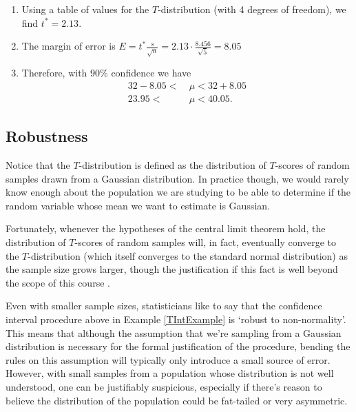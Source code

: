 \begin{example}
\begin{enumerate}[label=\textnormal{\Roman*}.]
\item Using a table of values for the $T$-distribution (with 4 degrees of freedom), we find $t^* = 2.13$.
\item The margin of error is $E = t^{*} \frac{s}{\sqrt{n}} = 2.13 \cdot \frac{8.456}{\sqrt{5}} = 8.05$
\item Therefore, with $90\%$ confidence we have
$$\begin{aligned}32 - 8.05 < \ &\mu < 32 + 8.05 \\
23.95 < \ &\mu < 40.05.\end{aligned}$$
\end{enumerate}
\end{example}

\subsection*{Robustness}
Notice that the $T$-distribution is defined as the distribution of $T$-scores of random samples drawn from a Gaussian distribution. In practice though, we would rarely know enough about the population we are studying to be able to determine if the random variable whose mean we want to estimate is Gaussian.

Fortunately, whenever the hypotheses of the central limit theorem hold, the distribution of $T$-scores of random samples will, in fact, eventually converge to the $T$-distribution (which itself converges to the standard normal distribution) as the sample size grows larger, though the justification if this fact is well beyond the scope of this course \cite{vanderVaart}. 

Even with smaller sample sizes, statisticians like to say that the confidence interval procedure above in Example \ref{TIntExample} is `robust to non-normality'. This means that although the assumption that we're sampling from a Gaussian distribution is necessary for the formal justification of the procedure, bending the rules on this assumption will typically only introduce a small source of error. However, with small samples from a population whose distribution is not well understood, one can be justifiably suspicious, especially if there's reason to believe the distribution of the population could be fat-tailed or very asymmetric.

